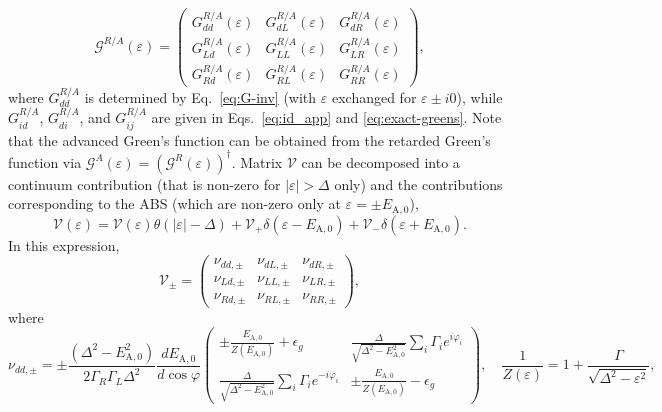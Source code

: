 \documentclass[aps,reprint,longbibliography, prb]{revtex4-2}
\begin{document}
\begin{equation}
\label{eq:GR-components}
\mathcal{G}^{R/A}(\varepsilon) =
\begin{pmatrix}
G^{R/A}_{dd}(\varepsilon) & G_{dL}^{R/A}(\varepsilon) & G_{dR}^{R/A}(\varepsilon)\\
G_{Ld}^{R/A}(\varepsilon) & G_{LL}^{R/A}(\varepsilon) & G_{LR}^{R/A}(\varepsilon)\\
G_{Rd}^{R/A}(\varepsilon) & G_{RL}^{R/A}(\varepsilon) & G_{RR}^{R/A}(\varepsilon)
\end{pmatrix},
\end{equation} where $G_{dd}^{R/A}$ is determined by Eq.~\eqref{eq:G-inv} (with $\varepsilon$ exchanged for $\varepsilon \pm i0$), while $G^{R/A}_{id}$, $G^{R/A}_{di}$, and $G^{R/A}_{ij}$ are given in Eqs.~\eqref{eq:id_app} and \eqref{eq:exact-greens}. Note that the advanced Green's function can be obtained from the retarded Green's function via $\mathcal{G}^A(\varepsilon) = (\mathcal{G}^R(\varepsilon))^\dagger$. Matrix $\mathcal{V}$ can be decomposed into a continuum contribution (that is non-zero for $|\varepsilon|>\Delta$ only) and the contributions corresponding to the ABS (which are non-zero only at $\varepsilon = \pm E_{\mathrm{A,0}}$),
\begin{equation}
    \label{eq:poles}
    \mathcal{V}(\varepsilon)=\mathcal{V}(\varepsilon)\theta(|\varepsilon|-\Delta)  + \mathcal{V}_+ \delta(\varepsilon - E_\mathrm{A,0}) + \mathcal{V}_- \delta(\varepsilon + E_\mathrm{A,0}).
\end{equation}
In this expression,
\begin{equation}
\mathcal{V}_{\pm} =
\begin{pmatrix}
\nu_{dd,\pm}    & \nu_{dL, \pm}  & \nu_{dR, \pm}\\
\nu_{Ld, \pm} & \nu_{LL, \pm} & \nu_{LR, \pm}\\
\nu_{Rd, \pm} & \nu_{RL, \pm} & \nu_{RR, \pm} 
\end{pmatrix},
\end{equation}
where
\begin{equation}
\nu_{dd,\pm} = \pm\frac{(\Delta^{2}-E_{\mathrm{A,0}}^{2})}{2\Gamma_{R}\Gamma_{L}\Delta^{2}}\frac{dE_\mathrm{A,0}}{d\cos\varphi}
\left(\begin{array}{cc}
\pm\frac{E_{\mathrm{A,0}}}{Z(E_{\mathrm{A,0}})}+\epsilon_{g} & \frac{\Delta}{\sqrt{\Delta^{2}-E_{\mathrm{A,0}}^{2}}}\sum_{i} \Gamma_i e^{i\varphi_i}\\
\frac{\Delta}{\sqrt{\Delta^{2}-E_{\mathrm{A,0}}^{2}}}\sum_{i} \Gamma_i e^{-i\varphi_i} & \pm\frac{E_{\mathrm{A,0}}}{Z(E_{\mathrm{A,0}})}-\epsilon_{g}
\end{array}\right),\quad \frac{1}{Z(\varepsilon)} = 1+\frac{\Gamma}{\sqrt{\Delta^2-\varepsilon^2}},
\end{equation}
\end{document}
